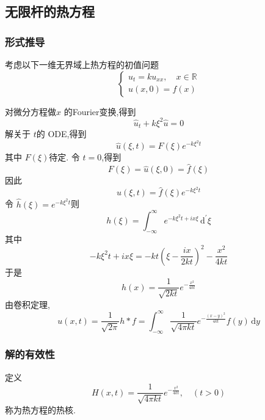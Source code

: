 \documentclass[../../main.tex]{subfiles}
\begin{document}
\subsection{无限杆的热方程}

\subsubsection{形式推导}

考虑以下一维无界域上热方程的初值问题 \[
\begin{cases} u_{t}= ku_{x x},\quad x\in \mathbb{R} \\ 
 u\left( x,0 \right)= f\left( x \right)   \end{cases} 
\]

对微分方程做\(  x  \) 的Fourier变换,得到 \[
\hat{u}_{t}+ k  \xi ^{2} \hat{u}= 0 
\]解关于 \(  t  \)的 ODE,得到 \[
\hat{u}\left(  \xi ,t \right) = F\left(  \xi  \right)e^{-k \xi ^{2}t}  
\]其中 \(  F\left(  \xi  \right)   \)待定.
令 \(  t= 0  \),得到 \[
F\left(  \xi  \right)= \hat{u}\left(  \xi ,0\right)=  \hat{f}\left(  \xi  \right)
\]  因此 \[
\hat{u}\left(  \xi ,t \right)= \hat{f}\left(  \xi  \right)e^{-k \xi ^{2}t}  
\] 令 \(  \hat{h} \left(  \xi  \right)=  e^{-k \xi ^{2}t}   \)则 \[
h\left(  \xi  \right)= \int_{-\infty}^{\infty}e^{-k \xi ^{2}t+  ix  \xi }\,\mathrm{d} ^{\prime}  \xi  
\]其中 \[
-k \xi ^{2} t+ ix  \xi = -kt\left(  \xi - \frac{ix }{2kt }  \right) ^{2}- \frac{x^{2} }{4kt } 
\]于是 \[
h\left(  x \right)= \frac{1 }{\sqrt{2kt} }e^{-\frac{x^{2} }{4kt } }  
\]由卷积定理, \[
u\left(  x ,t \right)= \frac{1 }{\sqrt{2\pi } } h*f= \int_{-\infty}^{\infty}\frac{1 }{\sqrt{4\pi kt} }e^{- \frac{\left( x-y \right)^{2}  }{4kt } } f\left( y\right)\,\mathrm{d} y   
\]
\subsubsection{解的有效性}

\begin{definition}
    定义 \[
    H\left( x,t \right)= \frac{1 }{\sqrt{4\pi kt} }e^{-\frac{x^{2} }{4kt } }  ,\quad \left( t> 0 \right) 
    \]称为热方程的热核.
\end{definition}
\end{document}
